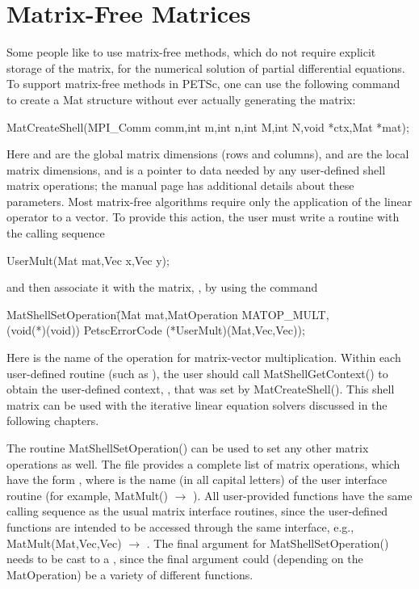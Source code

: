 \section{Matrix-Free Matrices} 
\label{sec_matrixfree}
Some people like to use matrix-free methods, which do not require
explicit storage of the matrix, for the numerical solution of partial
differential equations.  To support matrix-free methods in PETSc, one
can use the following command to create a Mat structure without
ever actually generating the matrix:
\begin{tabbing}
  MatCreateShell(MPI\_Comm comm,int m,int n,int M,int N,void *ctx,Mat *mat);
\end{tabbing}
Here  and  are the global matrix dimensions (rows and
columns),  and  are the local matrix dimensions, and
 is a pointer to data needed by any user-defined shell matrix
operations; the manual page has additional details about these
parameters.  Most matrix-free algorithms require only the application
of the linear operator to a vector. To provide this action, the user
must write a routine with the calling sequence
\begin{tabbing}
  UserMult(Mat mat,Vec x,Vec y);
\end{tabbing}
and then associate it with the matrix, , by using the 
command
\begin{tabbing}
  MatShellSetOperation\=(Mat mat,MatOperation MATOP\_MULT,\\
                      \>         (void(*)(void)) PetscErrorCode (*UserMult)(Mat,Vec,Vec));
\end{tabbing}
Here  is the name of the operation for matrix-vector
multiplication. Within each user-defined routine (such as
), the user should call
MatShellGetContext() to obtain the user-defined context, ,
that was set by MatCreateShell().
This shell matrix can be used with the iterative linear
equation solvers discussed in the following chapters.

The routine MatShellSetOperation() can be used to set any other
matrix operations as well.  The file 
 provides a complete list of matrix
operations, which have the form , where  is the name (in all capital letters) of the user
interface routine (for example, MatMult() $ \to $ ).  All
user-provided functions have the same calling sequence as the
usual matrix interface routines, since the user-defined functions are
intended to be accessed through the same interface, e.g., 
MatMult(Mat,Vec,Vec) $ \to$ .
The final argument for MatShellSetOperation() needs to be cast
to a , since the final argument could (depending on the 
MatOperation) be a variety of different functions.

